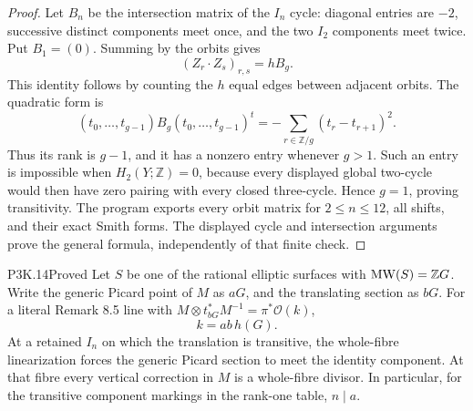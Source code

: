 \begin{proof}
Let \(B_n\) be the intersection matrix of the \(I_n\)
cycle: diagonal entries are \(-2\), successive distinct
components meet once, and the two \(I_2\) components meet
twice.  Put \(B_1=(0)\).  Summing by the orbits gives
\[
                 (Z_r\cdot Z_s)_{r,s}=h B_g.
\]
This identity follows by counting the \(h\) equal edges
between adjacent orbits.  The quadratic form is
\[
 (t_0,\ldots,t_{g-1})B_g(t_0,\ldots,t_{g-1})^t
       =-\sum_{r\in\mathbb Z/g}(t_r-t_{r+1})^2.
\]
Thus its rank is \(g-1\), and it has a nonzero entry whenever
\(g>1\).  Such an entry is impossible when
\(H_2(Y;\mathbb Z)=0\), because every displayed global
two-cycle would then have zero pairing with every closed
three-cycle.  Hence \(g=1\), proving transitivity.
The program  exports
every orbit matrix for \(2\le n\le12\), all shifts, and
their exact Smith forms.  The displayed cycle and intersection
arguments prove the general formula, independently of that
finite check.
\end{proof}

\begin{statement}{P3K.14}{Proved}
Let \(S\) be one of the rational elliptic surfaces with
\({\rm MW}(S)=\mathbb ZG\).  Write the generic Picard point
of \(M\) as \(aG\), and the translating section as \(bG\).
For a literal Remark 8.5 line with
\(M\otimes t_{bG}^*M^{-1}=\pi^*\mathcal O(k)\),
\[
                         k=ab\,h(G).
\]
At a retained \(I_n\) on which the translation is transitive,
the whole-fibre linearization forces the generic Picard section
to meet the identity component.  At that fibre every vertical
correction in \(M\) is a whole-fibre divisor.  In particular,
for the transitive component markings in the rank-one table,
\(n\mid a\).
\end{statement}

